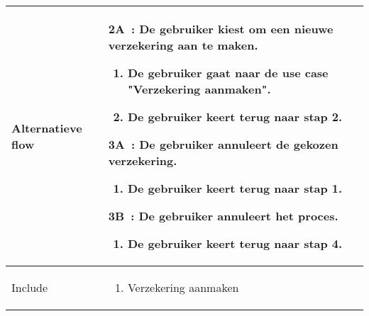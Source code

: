 \documentclass{article}
\begin{document}
\begin{tabularx}{\textwidth}{ | l | X |}
 Alternatieve flow & 
 \textbf{2A~:} De gebruiker kiest om een nieuwe verzekering aan te maken.
 \begin{enumerate}[label=\alph*]
 \item De gebruiker gaat naar de use case "Verzekering aanmaken".
 \item De gebruiker keert terug naar stap 2.
 \end{enumerate}  
 \textbf{3A~:} De gebruiker annuleert de gekozen verzekering.
 \begin{enumerate}[label=\alph*]
 \item De gebruiker keert terug naar stap 1.
 \end{enumerate}  
 \textbf{3B~:} De gebruiker annuleert het proces.
 \begin{enumerate}[label=\alph*]
 \item De gebruiker keert terug naar stap 4.
 \end{enumerate} \\ 
 \hline

 Include & 
 \begin{enumerate}
 \item Verzekering aanmaken
 \end{enumerate}
   \\ 
 \hline
\end{tabularx}
\newpage
\end{document}

